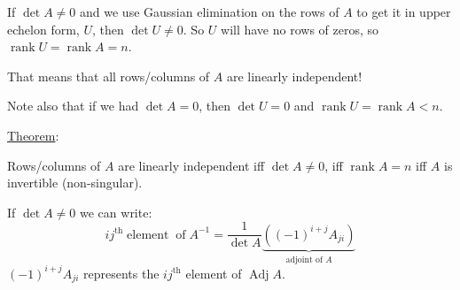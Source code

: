 \documentclass{article}
\newcommand{\nocomma}{}
\newcommand{\tmop}[1]{\ensuremath{\operatorname{#1}}}
\begin{document}
If $\det A \neq 0$ and we use Gaussian elimination on the rows of $A$ to get
it in upper echelon form, $U$, then $\det U \neq 0$. So $U$ will have no rows
of zeros, so {$\tmop{rank} U = \tmop{rank} A = {} n$}.

That means that all rows/columns of $A$ are linearly independent!

Note also that if we had $\det A = 0$, then $\det U = 0$ and $\tmop{rank} U =
\tmop{rank} A < n$.

\begin{tmornamented}
  {\underline{Theorem}}:
  
  Rows/columns of $A$ are linearly independent iff $\det A \neq 0$, iff
  $\tmop{rank} A = n$ iff $A$ is invertible (non-singular).
  
  If $\det A \neq 0$ we can write:
  \[ i \nocomma j^{\tmop{th}} \tmop{element} \tmop{of} A^{- 1}  =
     \frac{1}{\det A}  \underbrace{((- 1)^{i + j} A_{j \nocomma i})
     }_{\text{adjoint of $A$}} \]
  $(- 1)^{i + j} A_{j \nocomma i}$ represents the $i \nocomma j^{\tmop{th}}$
  element of $\tmop{Adj} A$.
\end{tmornamented}
\end{document}
